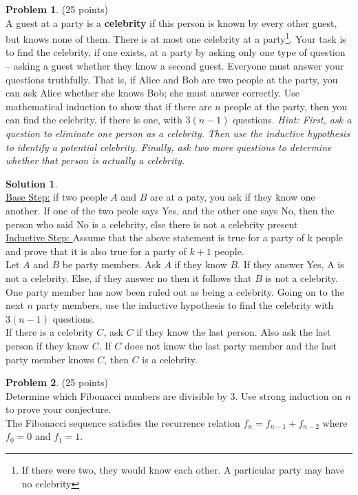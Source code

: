 \documentclass{article}
\theoremstyle{definition}
\newtheorem{problem}{Problem}
\newtheorem*{solution}{Solution}
\begin{document}
\newpage

\begin{problem} (25 points)\\
A guest at a party is a \textbf{celebrity} if this person is known by every other guest, but knows none of them. 
There is at most one celebrity at a party\footnote{If there were two, they
would know each other. A particular party may have no celebrity}. 
Your task is to find the celebrity, if one exists, at a party by asking only one type of question --
asking a guest whether they know a second guest.
Everyone must answer your questions truthfully.
That is, if Alice and Bob are two people at the party, you can ask Alice whether she knows Bob; 
she must answer correctly.
Use mathematical induction to show that if there are $n$ people at the party, then you can find the celebrity, if there is one, with $3(n-1)$ questions. 
\textit{Hint: First, ask a question to eliminate one person as a celebrity. 
Then use the inductive hypothesis to identify a potential celebrity.
Finally, ask two more questions to determine whether that person is actually a celebrity.} 
\end{problem}

\begin{solution}\ \\
\underline{Base Step:} if two people $A$ and $B$ are at a paty, you ask if they know one another. If one of the two peole says Yes, and the other one says No, then the person who said No is a celebrity, else there is not a celebrity present \\
\underline{Inductive Step: } Assume that the above statement is true for a party of k people and prove that it is also true for a party of $k+1$ people.\\
Let $A$ and $B$ be party members. Ask $A$ if they know $B$. If they answer Yes, A is not a celebrity. Else, if they answer no then it follows that $B$ is not a celebrity. One party member has now been ruled out as being a celebrity. Going on to the next $n$ party members, use the inductive hypothesis to find the celebrity with $3(n-1)$ questions.\\
If there is a celebrity $C$, ask $C$ if they know the last person. Also ask the last person if they know $C$. If $C$ does not know the last party member and the last party member knows $C$, then $C$ is a celebrity.
\end{solution}

\newpage

\begin{problem} (25 points)\\
Determine which Fibonacci numbers are divisible by 3. Use strong induction on $n$ to prove your conjecture.\\
The Fibonacci sequence satisfies the recurrence relation $f_n = f_{n-1} + f_{n-2}$ where $f_0 = 0$ and $f_1 = 1$.
\end{problem}
\end{document}
